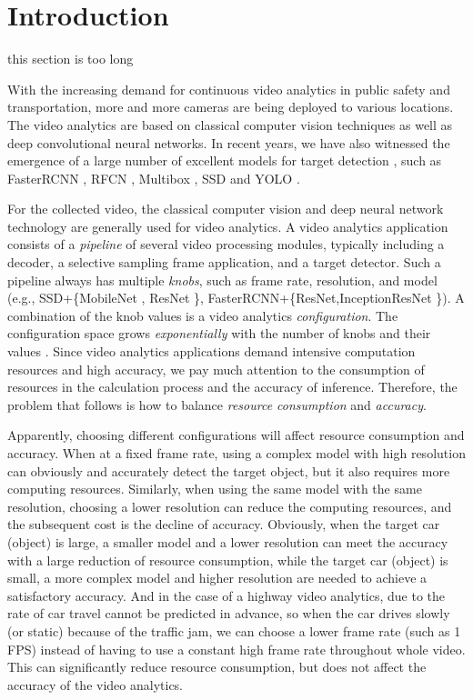 \section{Introduction}
\textcolor{note}{this section is too long}

\label{Section: introduction}
With the increasing demand for continuous video analytics in public safety and transportation, more and more cameras are being deployed to various locations. The video analytics are based on classical computer vision techniques as well as deep convolutional neural networks. In recent years, we have also witnessed the emergence of a large number of excellent models for target detection \cite{trade-offs}, such as FasterRCNN \cite{ren2015faster_rcnn}, RFCN \cite{dai2016r_fcn}, Multibox \cite{szegedy2014multibox}, SSD \cite{liu2016ssd} and YOLO \cite{redmon2016yolo}.

For the collected video, the classical computer vision and deep neural network technology are generally used for video analytics. A video analytics application consists of a \emph{pipeline} of several video processing modules, typically including a decoder, a selective sampling frame application, and a target detector. Such a pipeline always has multiple \emph{knobs}, such as frame rate, resolution, and model (e.g., SSD+\{MobileNet \cite{MobileNetV2}, ResNet \cite{he2016resnet}\}, FasterRCNN+\{ResNet,InceptionResNet \cite{szegedy2016inception}\}). A combination of the knob values is a video analytics \emph{configuration}. The configuration space grows \emph{exponentially} with the number of knobs and their values \cite{jiang2018chameleon}. Since video analytics applications demand intensive computation resources and high accuracy, we pay much attention to the consumption of resources in the calculation process and the accuracy of inference. Therefore, the problem that follows is how to balance \emph{resource consumption} and \emph{accuracy}. 

Apparently, choosing different configurations will affect resource consumption and accuracy. When at a fixed frame rate, using a complex model with high resolution can obviously and accurately detect the target object, but it also requires more computing resources. Similarly, when using the same model with the same resolution, choosing a lower resolution can reduce the computing resources, and the subsequent cost is the decline of accuracy. Obviously, when the target car (object) is large, a smaller model and a lower resolution can meet the accuracy with a large reduction of resource consumption, while the target car (object) is small, a more complex model and higher resolution are needed to achieve a satisfactory accuracy. And in the case of a highway video analytics, due to the rate of car travel cannot be predicted in advance, so when the car drives slowly (or static) because of the traffic jam, we can choose a lower frame rate (such as 1 FPS) instead of having to use a constant high frame rate throughout whole video. This can significantly reduce resource consumption, but does not affect the accuracy of the video analytics. 

